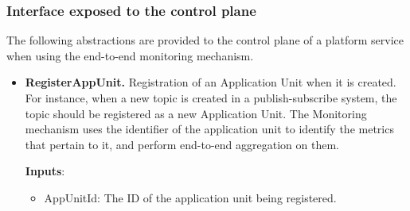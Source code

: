 \subsubsection{Interface exposed to the control plane}
The following abstractions are provided to the control plane of a platform service when using the end-to-end monitoring mechanism.
\begin{itemize}
\item \textbf{RegisterAppUnit.} Registration of an Application Unit when it is created. For instance, when a new topic is created in a publish-subscribe system, the topic should be registered as a new Application Unit. The Monitoring mechanism uses the identifier of the application unit to identify the metrics that pertain to it, and perform end-to-end aggregation on them. 
\par \noindent \textbf{Inputs}:
\begin{itemize}
\item AppUnitId: The ID of the application unit being registered.
\end{itemize}


\end{itemize}
